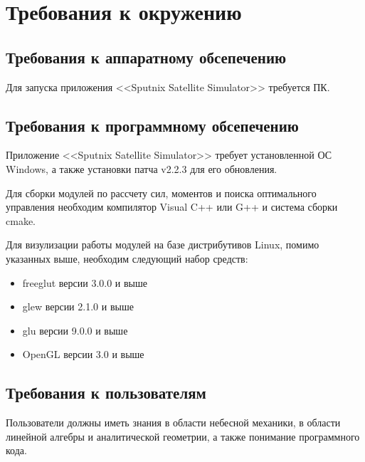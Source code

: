 \chapter{Требования к окружению}
\section{Требования к аппаратному обсепечению}
\noindent\indent Для запуска приложения <<Sputnix Satellite Simulator>> требуется
ПК.
\section{Требования к программному обсепечению}
\noindent\indent Приложение <<Sputnix Satellite Simulator>> требует установленной
ОС Windows, а также установки патча v2.2.3 для его обновления.\par
Для сборки модулей по рассчету сил, моментов и поиска оптимального
управления необходим компилятор Visual C++ или G++ и система сборки cmake.\par
Для визулизации работы модулей на базе дистрибутивов Linux, помимо
указанных выше, необходим следующий набор средств:
\begin{itemize}
  \item freeglut версии 3.0.0 и выше
  \item glew версии 2.1.0 и выше
  \item glu версии 9.0.0 и выше
  \item OpenGL версии 3.0 и выше
\end{itemize}
\section{Требования к пользователям}
\noindent\indent Пользователи должны иметь знания в области небесной механики,
в области линейной алгебры и аналитической геометрии, а также понимание программного
кода.
